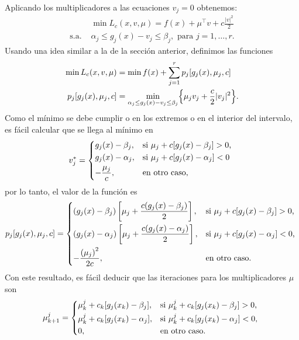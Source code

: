 Aplicando los multiplicadores a las ecuaciones \(v_{j}=0\) obtenemos:
\begin{align*}
					& \min L_{c}(x, v, \mu) = f(x) + \mu^{\top} v + c \frac{\lvert v \rvert^{2}}{2} \\
	\text{s.a. }	& \alpha_{j} \leq g_{j}(x) - v_{j} \leq \beta_{j}, \text{ para } j = 1, \dotsc, r.
\end{align*}
Usando una idea similar a la de la sección anterior, definimos las funciones
\begin{align*}
	\min L_{c}(x, v, \mu)		&= \min f(x) + \sum_{j=1}^{r} p_{j}[g_{j}(x), \mu_{j}, c] \\
	p_{j}[g_{j}(x), \mu_{j}, c]	&= \min_{\alpha_{j} \leq g_{j}(x) - v_{j} \leq \beta_{j}} \Bigl\{\mu_{j} v_{j} + \frac{c}{2} \lvert v_{j} \rvert^{2}\Bigr\}.
\end{align*}
Como el mínimo se debe cumplir o en los extremos o en el interior del intervalo, es fácil calcular que se llega al mínimo en
\begin{equation*}
	v_{j}^{\ast} = \begin{dcases*}
		g_{j}(x) - \beta_{j},	& si \(\mu_{j} + c[g_{j}(x) - \beta_{j}] > 0\), \\
		g_{j}(x)-\alpha_{j},	& si \(\mu_{j} + c[g_{j}(x) - \alpha_{j}] < 0\) \\
		-\frac{\mu_{j}}{c},		& en otro caso,
	\end{dcases*}
\end{equation*}
por lo tanto, el valor de la función es
\begin{equation*}
	p_{j}[g_{j}(x), \mu_{j}, c] = \begin{dcases*}
		(g_{j}(x) - \beta_{j}) \left[\mu_{j} + \frac{c (g_{j}(x) - \beta_{j})}{2}\right],	& si \(\mu_{j} + c[g_{j}(x) - \beta_{j}] > 0\), \\
		(g_{j}(x) - \alpha_{j}) \left[\mu_{j} + \frac{c (g_{j}(x) - \alpha_{j})}{2}\right],	& si \(\mu_{j} + c[g_{j}(x) - \alpha_{j}] < 0\), \\
		-\frac{\left( \mu_{j}\right)^{2}}{2c},												& en otro caso.
	\end{dcases*}
\end{equation*}
Con este resultado, es fácil deducir que las iteraciones para los multiplicadores \(\mu\) son
\begin{equation*}
	\mu_{k+1}^{j} = \begin{dcases*}
		\mu_{k}^{j} + c_{k}[g_{j}(x_{k}) - \beta_{j}],	& si \(\mu_{k}^{j} + c_{k}[g_{j}(x_{k}) - \beta_{j}] > 0\), \\
		\mu_{k}^{j} + c_{k}[g_{j}(x_{k}) - \alpha_{j}],	& si \(\mu_{k}^{j} + c_{k}[g_{j}(x_{k}) - \alpha_{j}] < 0\), \\
		0,												& en otro caso.
	\end{dcases*}
\end{equation*}
